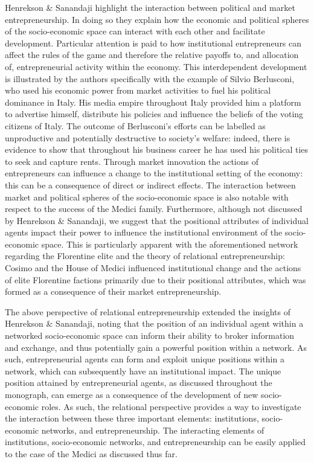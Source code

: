 Henrekson \& Sanandaji highlight the interaction between political and market entrepreneurship. In doing so they explain how the economic and political spheres of the socio-economic space can interact with each other and facilitate development. Particular attention is paid to how institutional entrepreneurs can affect the rules of the game and therefore the relative payoffs to, and allocation of, entrepreneurial activity within the economy. This interdependent development is illustrated by the authors specifically with the example of Silvio Berlusconi, who used his economic power from market activities to fuel his political dominance in Italy. His media empire throughout Italy provided him a platform to advertise himself, distribute his policies and influence the beliefs of the voting citizens of Italy. The outcome of Berlusconi's efforts can be labelled as unproductive and potentially destructive to society's welfare: indeed, there is evidence to show that throughout his business career he has used his political ties to seek and capture rents. Through market innovation the actions of entrepreneurs can influence a change to the institutional setting of the economy: this can be a consequence of direct or indirect effects. The interaction between market and political spheres of the socio-economic space is also notable with respect to the success of the Medici family. Furthermore, although not discussed by Henrekson \& Sanandaji, we suggest that the positional attributes of individual agents impact their power to influence the institutional environment of the socio-economic space. This is particularly apparent with the aforementioned network regarding the Florentine elite and the theory of relational entrepreneurship: Cosimo and the House of Medici influenced institutional change and the actions of elite Florentine factions primarily due to their positional attributes, which was formed as a consequence of their market entrepreneurship.

The above perspective of relational entrepreneurship extended the insights of Henrekson \& Sanandaji, noting that the position of an individual agent within a networked socio-economic space can inform their ability to broker information and exchange, and thus potentially gain a powerful position within a network. As such, entrepreneurial agents can form and exploit unique positions within a network, which can subsequently have an institutional impact. The unique position attained by entrepreneurial agents, as discussed throughout the monograph, can emerge as a consequence of the development of new socio-economic roles. As such, the relational perspective provides a way to investigate the interaction between these three important elements: institutions, socio-economic networks, and entrepreneurship. The interacting elements of institutions, socio-economic networks, and entrepreneurship can be easily applied to the case of the Medici as discussed thus far.

